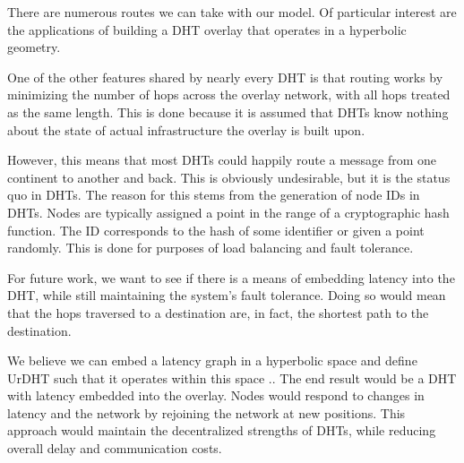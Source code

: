 \documentclass[11pt,conference]{IEEEtran}
\begin{document}

There are numerous routes we can take with our model.
Of particular interest are the applications of building a DHT overlay that operates in a hyperbolic geometry.

One of the other features shared by nearly every DHT is that routing works by minimizing the number of hops across the overlay network, with all hops treated as the same length.
This is done because it is assumed that DHTs know nothing about the state of actual infrastructure the overlay is built upon.

However, this means that most DHTs could happily route a message from one continent to another and back.
This is obviously undesirable, but it is the status quo in DHTs.
The reason for this stems from the generation of node IDs in DHTs. 
Nodes are typically assigned a point in the range of a cryptographic hash function. 
The ID corresponds to the hash of some identifier or given a point randomly.
This is done for purposes of load balancing and fault tolerance.

For future work, we want to see if there is a means of embedding latency into the DHT, while still maintaining the system's fault tolerance.
Doing so would mean that the hops traversed to a destination are, in fact, the shortest path to the destination.

We believe we can embed a latency graph in a hyperbolic space and define UrDHT such that it operates within this space \cite{kleinberg2007geographic} \cite{cvetkovski2009hyperbolic}..
The end result would be a DHT with latency embedded into the overlay.
Nodes would respond to changes in latency and the network by rejoining the network at new positions.
This approach would maintain the decentralized strengths of DHTs, while reducing overall delay and communication costs.






\end{document}
